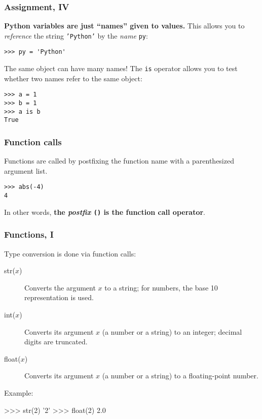 \documentclass[english,serif,mathserif,xcolor=pdftex,dvipsnames,table]{beamer}
\begin{document}
\begin{frame}
  \frametitle{Assignment, IV}

  \textbf{Python variables are just ``names'' given to values.}
  This allows you to \emph{reference} the string \texttt{'Python'}
  by the \emph{name} \texttt{py}:
\begin{lstlisting}
>>> py = 'Python'
\end{lstlisting}

  \+ The same object can have many names! The \texttt{is} operator
  allows you to test whether two names refer to the same object:
\begin{lstlisting}
>>> a = 1
>>> b = 1
>>> a is b
True
\end{lstlisting}

\end{frame}


\begin{frame}[fragile]
  \frametitle{Function calls}
  Functions are called by postfixing the function name with a
  parenthesized argument list.

  \+
\begin{lstlisting}
>>> abs(-4)
4
\end{lstlisting}

  \+
  In other words, \textbf{the \emph{postfix} \texttt{()} is the function call operator}.
\end{frame}


\begin{frame}
  \frametitle{Functions, I}

  Type conversion is done via function calls:
  \begin{description}
  \item[str($x$)] Converts the argument $x$ to a string; for numbers,
    the base 10 representation is used.
  \item[int($x$)] Converts its argument $x$ (a number or a string) to an integer;
    decimal digits are truncated.
  \item[float($x$)] Converts its argument $x$ (a number or a string) to a
    floating-point number.
  \end{description}

  \+ 
  Example:
\begin{semiverbatim}
>>> str(2)
'2'
>>> float(2)
2.0
\end{semiverbatim}
\end{frame}
\end{document}
